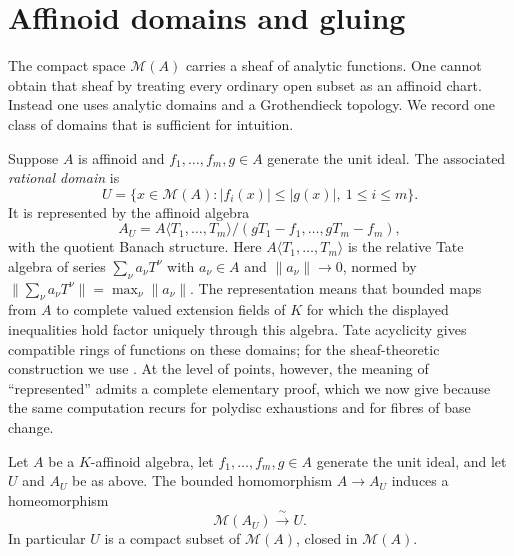 \section{Affinoid domains and gluing}
\label{sec:berk-affinoid-gluing}

The compact space $\mathcal M(A)$ carries a sheaf of analytic functions.
One cannot obtain that sheaf by treating every ordinary open subset as an
affinoid chart. Instead one uses analytic domains and a Grothendieck
topology. We record one class of domains that is sufficient for intuition.

Suppose $A$ is affinoid and $f_1,\ldots,f_m,g\in A$ generate the unit
ideal. The associated \emph{rational domain} is
\[
 U=\{x\in\mathcal M(A): |f_i(x)|\leq |g(x)|,\ 1\leq i\leq m\}.
\]
It is represented by the affinoid algebra
\[
 A_U=A\langle T_1,\ldots,T_m\rangle/(gT_1-f_1,\ldots,gT_m-f_m),
\]
with the quotient Banach structure. Here
$A\langle T_1,\ldots,T_m\rangle$ is the relative Tate
algebra of series $\sum_\nu a_\nu T^\nu$ with
$a_\nu\in A$ and $\|a_\nu\|\to0$, normed by
$\|\sum_\nu a_\nu T^\nu\|=\max_\nu\|a_\nu\|$.  The representation means
that bounded maps from $A$ to complete valued extension fields of $K$
for which the displayed inequalities hold factor uniquely through this
algebra. Tate acyclicity gives compatible rings of functions on these
domains; for the sheaf-theoretic construction we use
\cite[\S2.2]{Berk12}. At the level of
points, however, the meaning of ``represented'' admits a complete
elementary proof, which we now give because the same computation recurs
for polydisc exhaustions and for fibres of base change.

\begin{proposition}
\label{prop:berk-rational-domain}
Let $A$ be a $K$-affinoid algebra, let $f_1,\ldots,f_m,g\in A$
generate the unit ideal, and let $U$ and $A_U$ be as above. The
bounded homomorphism $A\to A_U$ induces a homeomorphism
\[
             \mathcal M(A_U)\xrightarrow{\ \sim\ }U.
\]
In particular $U$ is a compact subset of $\mathcal M(A)$, closed in
$\mathcal M(A)$.
\end{proposition}

